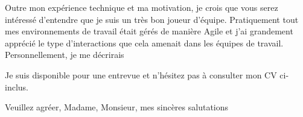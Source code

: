 Outre mon expérience technique et ma motivation, je crois que vous serez intéressé d'entendre que je suis un très bon joueur d'équipe. Pratiquement tout mes environnements de travail était gérés de manière Agile et j'ai grandement apprécié le type d'interactions que cela amenait dans les équipes de travail. Personnellement, je me décrirais 

Je suis disponible pour une entrevue et n’hésitez pas à consulter mon CV ci-inclus.

Veuillez agréer, Madame, Monsieur, mes sincères salutations

